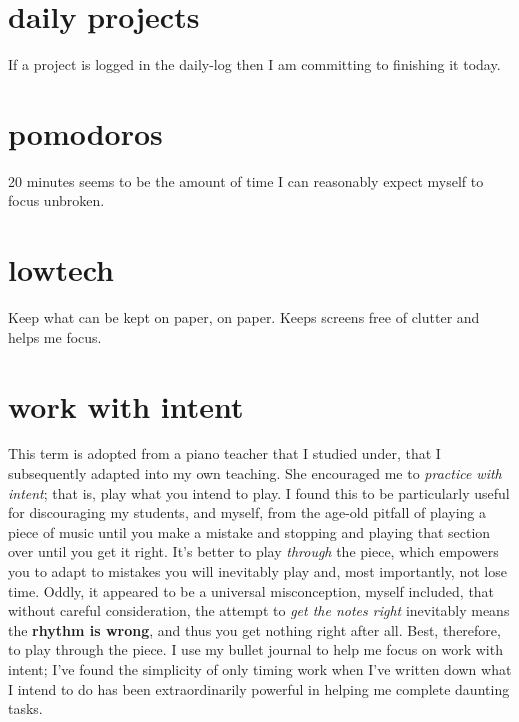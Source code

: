 \documentclass[]{book}
\begin{document}
\hypertarget{daily-projects}{%
\section{daily projects}\label{daily-projects}}

If a project is logged in the \protect\hypertarget{daily-log}{}{daily-log} then I am committing to finishing it today.

\hypertarget{pomodoros}{%
\section{pomodoros}\label{pomodoros}}

20 minutes seems to be the amount of time I can reasonably expect myself to focus unbroken.

\hypertarget{lowtech}{%
\section{lowtech}\label{lowtech}}

Keep what can be kept on paper, on paper. Keeps screens free of clutter and helps me focus.

\hypertarget{work-with-intent}{%
\section{work with intent}\label{work-with-intent}}

This term is adopted from a piano teacher that I studied under, that I subsequently adapted into my own teaching. She encouraged me to \emph{practice with intent}; that is, play what you intend to play. I found this to be particularly useful for discouraging my students, and myself, from the age-old pitfall of playing a piece of music until you make a mistake and stopping and playing that section over until you get it right. It's better to play \emph{through} the piece, which empowers you to adapt to mistakes you will inevitably play and, most importantly, not lose time. Oddly, it appeared to be a universal misconception, myself included, that without careful consideration, the attempt to \emph{get the notes right} inevitably means the \textbf{rhythm is wrong}, and thus you get nothing right after all. Best, therefore, to play through the piece. I use my bullet journal to help me focus on work with intent; I've found the simplicity of only timing work when I've written down what I intend to do has been extraordinarily powerful in helping me complete daunting tasks.
\end{document}
